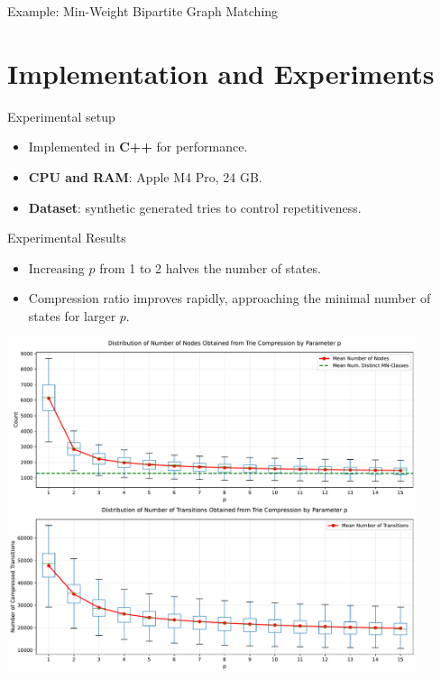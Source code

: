 \documentclass[aspectratio=169]{beamer}
\begin{document}
\begin{frame}{Example: Min-Weight Bipartite Graph Matching}
\begin{figure}[H]
\begin{subfigure}[b]{0.3\textwidth}
        \caption{}
        \label{fig:sub3}
    \end{subfigure}
    \label{fig:reduction_small_examples}
  \end{figure}
\end{frame}


\section{Implementation and Experiments}
\begin{frame}{Experimental setup}
  \begin{itemize}
    \item Implemented in \textbf{C++} for performance.
    \item \textbf{CPU and RAM}: Apple M4 Pro, 24 GB.
    \item \textbf{Dataset}: synthetic generated tries to control repetitiveness.
  \end{itemize}
\end{frame}

\begin{frame}{Experimental Results}
  \begin{itemize}
    \item Increasing $p$ from 1 to 2 halves the number of states.
    \item Compression ratio improves rapidly, approaching the minimal number of states for larger $p$.
  \end{itemize}
  \centering
  \includegraphics[width=0.9\textwidth]{img/tree_compression_analysis_high_a.pdf}
\end{frame}
\end{document}
